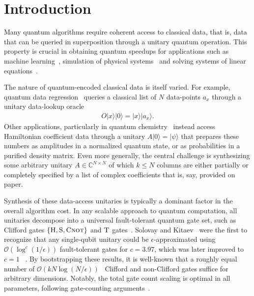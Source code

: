 \documentclass[a4paper,onecolumn,10pt,accepted=2024-05-22]{quantumarticle}
\newcommand{\ket}[1]{| #1\rangle}        %
\begin{document}
	\section{Introduction} 
 Many quantum algorithms require coherent access to classical data, that is, data that can be queried in superposition through a unitary quantum operation. This property is crucial in obtaining quantum speedups for applications such as machine learning~\cite{LloydMohseniRebentrost2014}, simulation of physical systems~\cite{Berry2015Truncated,Low2016HamSim} and solving systems of linear equations~\cite{Harrow2009,Wang2018NonSparse}. 
	
The nature of quantum-encoded classical data is itself varied. For example, quantum data regression~\cite{Wiebe2012Fitting} queries a classical list of $N$ data-points $a_{x}$ through a unitary data-lookup oracle~\cite{Aharonov2003Adiabatic} 
 \begin{align}
     O\ket{x}\ket{0}=\ket{x}\ket{a_x}.
 \end{align}
 Other applications, particularly in quantum chemistry~\cite{Babbush2018encoding} instead access Hamiltonian coefficient data through a unitary $A\ket{0}=\ket{\psi}$ that prepares these numbers as amplitudes in a normalized quantum state, or as probabilities in a purified density matrix. Even more generally, the central challenge is synthesizing some arbitrary unitary $A\in\mathbb{C}^{N\times N}$ of which $k\le N$ columns are either partially or completely specified by a list of complex coefficients that is, say, provided on paper.
	
	Synthesis of these data-access unitaries is typically a dominant factor in the overall algorithm cost. In any scalable approach to quantum computation, all unitaries decompose into a universal fault-tolerant quantum gate set, such as Clifford gates $\{\textsc{H},\textsc S,\textsc{Cnot}\}$ and $\textsc{T}$ gates~\cite{Nielsen2004}. Solovay and Kitaev~\cite{Nielsen2004} were the first to recognize that any single-qubit unitary could be $\epsilon$-approximated using $\mathcal{O}(\log^c{(1/\epsilon)})$ fault-tolerant gates for $c=3.97$, which was later improved to $c=1$ ~\cite{Kliuchnikov2013synthesis,Ross2016Optimal}. By bootstrapping these results, it is well-known that a roughly equal number of $\mathcal{O}(kN\log{(N/\epsilon)})$~\cite{shende2006synthesis} Clifford and non-Clifford gates suffice for arbitrary dimensions. Notably, the total gate count scaling is optimal  in all parameters, following gate-counting arguments~\cite{Harrow2002}.
	
\end{document}
